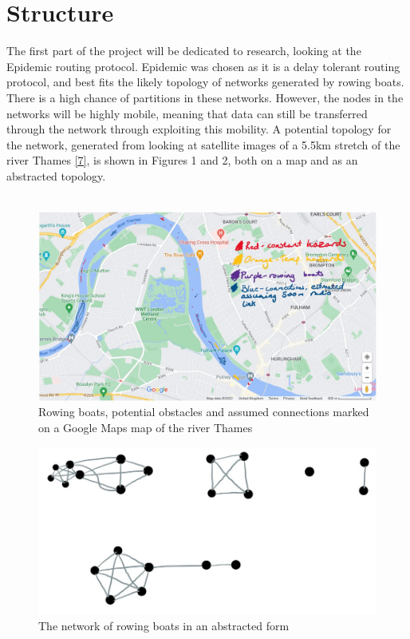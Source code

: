 \documentclass[10pt, a4paper]{article}
\begin{document}
\section*{Structure}
The first part of the project will be dedicated to research, looking at the Epidemic routing protocol. Epidemic was chosen as it is a delay tolerant routing protocol, and best fits the likely topology of networks generated by rowing boats. There is a high chance of partitions in these networks. However, the nodes in the networks will be highly mobile, meaning that data can still be transferred through the network through exploiting this mobility. A potential topology for the network, generated from looking at satellite images of a 5.5km stretch of the river Thames \hyperref[googlemaps]{[7]}, is shown in Figures 1 and 2, both on a map and as an abstracted topology. \\ \\
\begin{figure}[h]
\caption{Rowing boats, potential obstacles and assumed connections marked on a Google Maps map of the river Thames}
\begin{center}
\includegraphics[scale=0.5]{googlemaps.jpg}
\end{center}
\end{figure}
\par
\begin{figure}[h]
\begin{center}
\caption{The network of rowing boats in an abstracted form}
\includegraphics[scale=0.5]{lines.jpg}
\end{center}
\end{figure}
\end{document}
